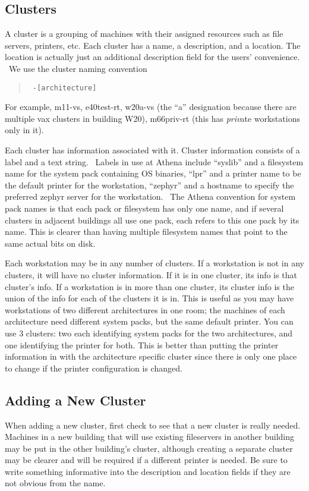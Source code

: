 \documentclass{book}
\begin{document}
\subsection{Clusters}
A cluster is a grouping of machines with their assigned resources such
as file servers, printers, etc.  Each cluster has a name, a
description, and a location.  The location is actually just an
additional description field for the users' convenience.  \athena\ We
use the cluster naming convention
\begin{quotation}\tt
{}-[architecture]
\end{quotation}
For example, m11-vs, e40test-rt, w20a-vs (the ``a'' designation because
there are multiple vax clusters in building W20), m66priv-rt (this has
{\em priv}ate workstations only in it).

Each cluster has information associated with it.  Cluster information
consists of a label and a text string.  \athena\ Labels in use at
Athena include ``syslib'' and a filesystem name for the system pack
containing OS binaries, ``lpr'' and a printer name to be the default
printer for the workstation, ``zephyr'' and a hostname to specify the
preferred zephyr server for the workstation.  \athena\ The Athena
convention for system pack names is that each pack or filesystem has
only one name, and if several clusters in adjacent buildings all use
one pack, each refers to this one pack by its name.  This is clearer
than having multiple filesystem names that point to the same actual
bits on disk.

Each workstation may be in any number of clusters.  If a workstation
is not in any clusters, it will have no cluster information.  If it is
in one cluster, its info is that cluster's info.  If a workstation is
in more than one cluster, its cluster info is the union of the info
for each of the clusters it is in.  This is useful as you may have
workstations of two different architectures in one room; the machines
of each architecture need different system packs, but the same default
printer.  You can use 3 clusters: two each identifying system packs for
the two architectures, and one identifying the printer for both.  This
is better than putting the printer information in with the
architecture specific cluster since there is only one place to change
if the printer configuration is changed.

\subsection{Adding a New Cluster}
When adding a new cluster, first check to see that a new cluster is
really needed.  Machines in a new building that will use existing
fileservers in another building may be put in the other building's
cluster, although creating a separate cluster may be clearer and will
be required if a different printer is needed.  Be sure to write
something informative into the description and location fields if they
are not obvious from the name.
\end{document}
